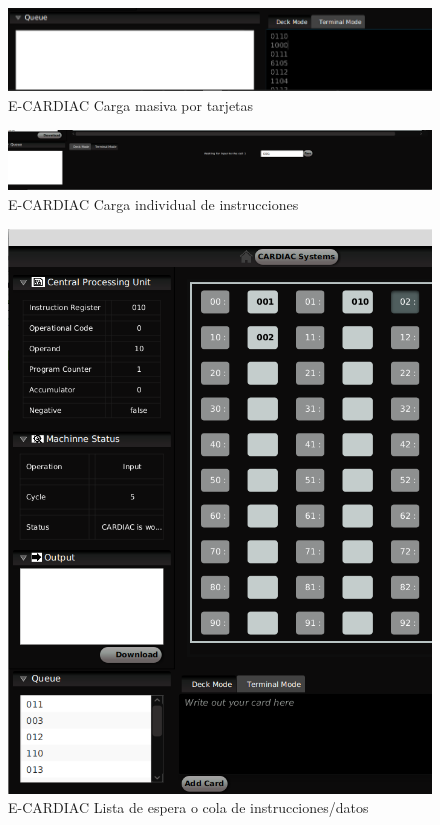 \documentclass[letterpaper,12pt,oneside]{book}
\begin{document}
	\begin{figure}[h]
 			\centering
			\includegraphics[scale=0.4]{media/ECARDIAC/DeckModeLoaded.png}
			\caption{E-CARDIAC Carga masiva por tarjetas}
			\label{fig:ecardiacDeckMode}
	\end{figure}
	
	\begin{figure}[h]
 			\centering
			\includegraphics[scale=0.25]{media/ECARDIAC/TerminalMode.png}
			\caption{E-CARDIAC Carga individual de instrucciones}
			\label{fig:ecardiacTerminalMode}
	\end{figure}
	
	\begin{figure}[h]
 			\centering
			\includegraphics[scale=0.4]{media/ECARDIAC/QueueCargada.png}
			\caption{E-CARDIAC Lista de espera o cola de instrucciones/datos}
			\label{fig:ecardiacQueue}
	\end{figure}		
	
\end{document}
